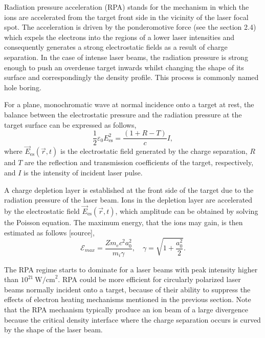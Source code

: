 Radiation pressure acceleration (RPA) stands for the mechanism in which the ions are accelerated from the target front side in the vicinity of the laser focal spot. The acceleration is driven by the ponderomotive force (see the section 2.4) which expels the electrons into the regions of a lower laser intensities and consequently generates a strong electrostatic fields as a result of charge separation. In the case of intense laser beams, the radiation pressure is strong enough to push an overdense target inwards whilst changing the shape of its surface and correspondingly the density profile. This process is commonly named hole boring.

For a plane, monochromatic wave at normal incidence onto a target at rest, the balance between the electrostatic pressure and the radiation pressure at the target surface can be expressed as follows,
\begin{equation}
\label{2.7.1.1}
\frac{1}{2} \varepsilon_0 E_{\mathrm{es}}^2 = \frac{\left( 1 + R - T \right)}{c} I,
\end{equation}
where $ \vec{E}_{\mathrm{es}} \left(\vec{r}, t \right) $ is the electrostatic field generated by the charge separation, $ R $ and $ T $ are the reflection and transmission coefficients of the target, respectively, and $ I $ is the intensity of incident laser pulse.

A charge depletion layer is established at the front side of the target due to the radiation pressure of the laser beam. Ions in the depletion layer are accelerated by the electrostatic field $ \vec{E}_{\mathrm{es}} \left(\vec{r}, t \right) $, which amplitude can be obtained by solving the Poisson equation. The maximum energy, that the ions may gain, is then estimated as follows [source],
\begin{equation}
\mathcal{E}_{max} = \frac{Z m_e c^2 a_0^2}{m_i \gamma}, \quad \gamma = \sqrt{1 + \frac{a_0^2}{2}}.
\end{equation}
 
The RPA regime starts to dominate for a laser beams with peak intensity higher than $ 10^{21} \  \mathrm{W/cm}^2 $. RPA could be more efficient for circularly polarized laser beams normally incident onto a target, because of their ability to suppress the effects of electron heating mechanisms mentioned in the previous section. Note that the RPA mechanism typically produce an ion beam of a large divergence because the critical density interface where the charge separation occurs is curved by the shape of the laser beam.

